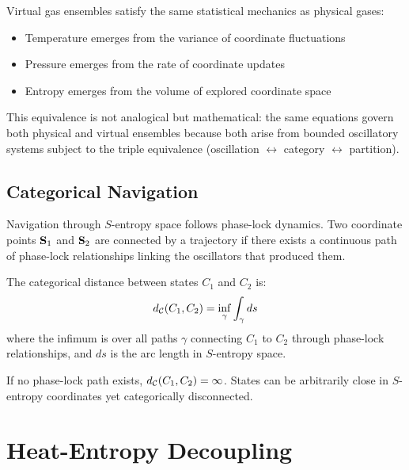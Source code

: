 Virtual gas ensembles satisfy the same statistical mechanics as physical gases:
\begin{itemize}
\item Temperature emerges from the variance of coordinate fluctuations
\item Pressure emerges from the rate of coordinate updates
\item Entropy emerges from the volume of explored coordinate space
\end{itemize}

This equivalence is not analogical but mathematical: the same equations govern both physical and virtual ensembles because both arise from bounded oscillatory systems subject to the triple equivalence (oscillation $\leftrightarrow$ category $\leftrightarrow$ partition).

\subsection{Categorical Navigation}

Navigation through $S$-entropy space follows phase-lock dynamics. Two coordinate points $\mathbf{S}_1$ and $\mathbf{S}_2$ are connected by a trajectory if there exists a continuous path of phase-lock relationships linking the oscillators that produced them.

\begin{definition}
\label{def:categorical_distance}
The categorical distance between states $C_1$ and $C_2$ is:
\begin{equation}
d_{\mathcal{C}}(C_1, C_2) = \inf_{\gamma} \int_\gamma ds
\end{equation}
where the infimum is over all paths $\gamma$ connecting $C_1$ to $C_2$ through phase-lock relationships, and $ds$ is the arc length in $S$-entropy space.
\end{definition}

If no phase-lock path exists, $d_{\mathcal{C}}(C_1, C_2) = \infty$. States can be arbitrarily close in $S$-entropy coordinates yet categorically disconnected.

\section{Heat-Entropy Decoupling}
\label{sec:heat_entropy}

